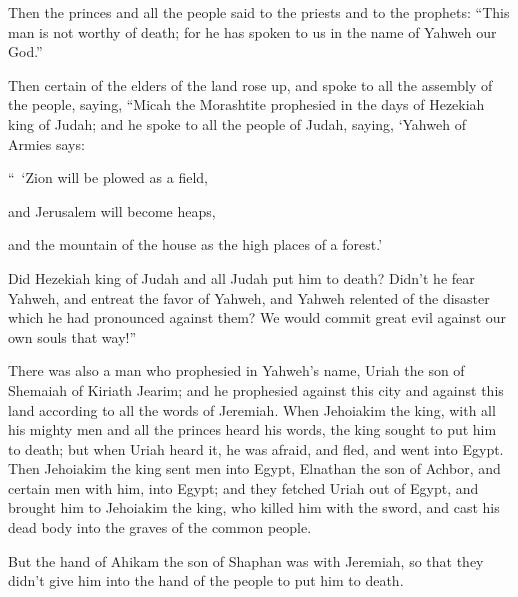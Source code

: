 {\par }{\PP {}Then the princes and all the people said to the priests and to the prophets: “This man is not worthy of death; for he has spoken to us in the name of Yahweh our God.”
\par }{\PP {}Then certain of the elders of the land rose up, and spoke to all the assembly of the people, saying,
“Micah the Morashtite prophesied in the days of Hezekiah king of Judah; and he spoke to all the people of Judah, saying, ‘Yahweh of Armies says:
\par }{\Q “ ‘Zion will be plowed as a field,
\par }{\QB and Jerusalem will become heaps,
\par }{\QB and the mountain of the house as the high places of a forest.’
\par }{\MM {}Did Hezekiah king of Judah and all Judah put him to death? Didn’t he fear Yahweh, and entreat the favor of Yahweh, and Yahweh relented of the disaster which he had pronounced against them? We would commit great evil against our own souls that way!”
\par }{\PP {}There was also a man who prophesied in Yahweh’s name, Uriah the son of Shemaiah of Kiriath Jearim; and he prophesied against this city and against this land according to all the words of Jeremiah.
When Jehoiakim the king, with all his mighty men and all the princes heard his words, the king sought to put him to death; but when Uriah heard it, he was afraid, and fled, and went into Egypt.
Then Jehoiakim the king sent men into Egypt, Elnathan the son of Achbor, and certain men with him, into Egypt;
and they fetched Uriah out of Egypt, and brought him to Jehoiakim the king, who killed him with the sword, and cast his dead body into the graves of the common people.
\par }{\PP {}But the hand of Ahikam the son of Shaphan was with Jeremiah, so that they didn’t give him into the hand of the people to put him to death.

}
